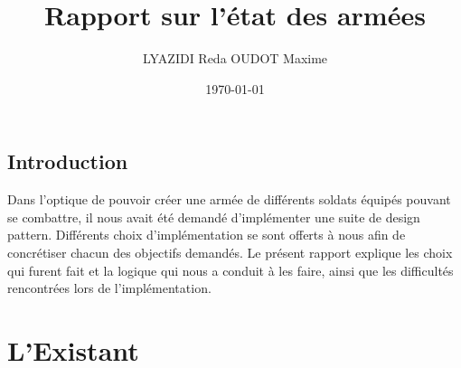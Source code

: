\documentclass[12pt]{article}
\title{Rapport sur l'état des armées}
\author{LYAZIDI Reda  \hspace*{1cm} OUDOT Maxime}
\date{\today}
\begin{document}
\maketitle
\tableofcontents

\newpage
\vspace*{8cm}
\begin{center} \section*{Introduction} \end{center}

Dans l'optique de pouvoir créer une armée de différents soldats équipés pouvant se combattre, il nous avait été demandé d'implémenter une suite de design pattern.
Différents choix d'implémentation se sont offerts à nous afin de concrétiser chacun des objectifs demandés.
Le présent rapport explique les choix qui furent fait et la logique qui nous a conduit à les faire, ainsi que les difficultés rencontrées lors de l'implémentation.

\newpage
\section{L'Existant}
\end{document}
